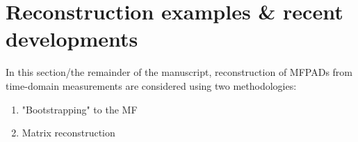 \section{Reconstruction examples & recent developments}

In this section/the remainder of the manuscript, reconstruction of MFPADs from time-domain measurements are considered using two methodologies:

\begin{enumerate}
\item "Bootstrapping" to the MF
\item Matrix reconstruction
\end{enumerate}